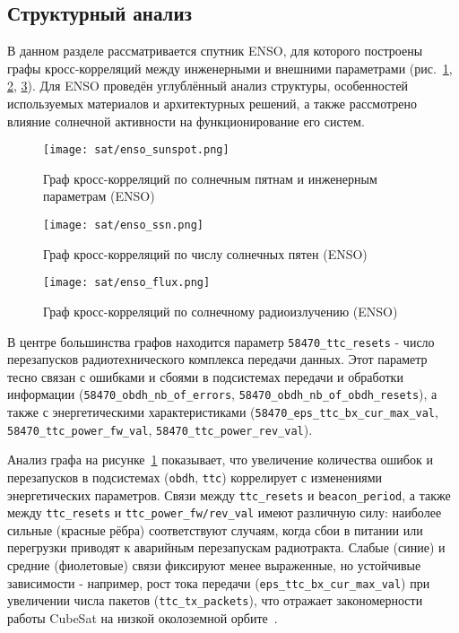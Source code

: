\subsection{Структурный анализ}

В данном разделе рассматривается спутник ENSO, для которого построены графы
кросс-корреляций между инженерными и внешними параметрами
(рис.~\ref{fig:enso_sunspot}, \ref{fig:enso_ssn}, \ref{fig:enso_flux}). Для ENSO
проведён углублённый анализ структуры, особенностей используемых материалов и
архитектурных решений, а также рассмотрено влияние солнечной активности на
функционирование его систем.

\begin{figure}[H]
	\centering
	\texttt{[image: sat/enso\_sunspot.png]}
	\caption{Граф кросс-корреляций по солнечным пятнам и инженерным параметрам (ENSO)}
	\label{fig:enso_sunspot}
\end{figure}

\begin{figure}[H]
	\centering
	\texttt{[image: sat/enso\_ssn.png]}
	\caption{Граф кросс-корреляций по числу солнечных пятен (ENSO)}
	\label{fig:enso_ssn}
\end{figure}

\begin{figure}[H]
	\centering
	\texttt{[image: sat/enso\_flux.png]}
	\caption{Граф кросс-корреляций по солнечному радиоизлучению (ENSO)}
	\label{fig:enso_flux}
\end{figure}

В центре большинства графов находится параметр \texttt{58470\_ttc\_resets} -
число перезапусков радиотехнического комплекса передачи данных. Этот параметр
тесно связан с ошибками и сбоями в подсистемах передачи и обработки информации
(\texttt{58470\_obdh\_nb\_of\_errors},
\texttt{58470\_obdh\_nb\_of\_obdh\_resets}), а также с энергетическими
характеристиками (\texttt{58470\_eps\_ttc\_bx\_cur\_max\_val},
\texttt{58470\_ttc\_power\_fw\_val}, \texttt{58470\_ttc\_power\_rev\_val}).

Анализ графа на рисунке~\ref{fig:enso_sunspot} показывает, что увеличение
количества ошибок и перезапусков в подсистемах (\texttt{obdh}, \texttt{ttc})
коррелирует с изменениями энергетических параметров. Связи между
\texttt{ttc\_resets} и \texttt{beacon\_period}, а также между
\texttt{ttc\_resets} и \texttt{ttc\_power\_fw/rev\_val} имеют различную силу:
наиболее сильные (красные рёбра) соответствуют случаям, когда сбои в питании или
перегрузки приводят к аварийным перезапускам радиотракта. Слабые (синие) и
средние (фиолетовые) связи фиксируют менее выраженные, но устойчивые зависимости
- например, рост тока передачи (\texttt{eps\_ttc\_bx\_cur\_max\_val}) при
увеличении числа пакетов (\texttt{ttc\_tx\_packets}), что отражает
закономерности работы CubeSat на низкой околоземной
орбите~\cite{expleo_enso_pdf}.

